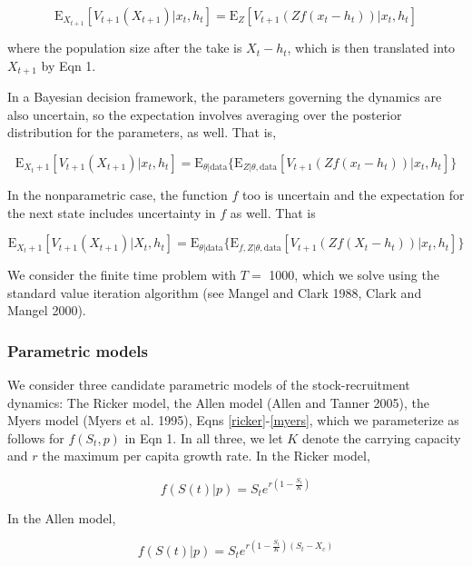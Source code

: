 \documentclass[author-year, 12pt,review]{components/elsarticle} %
\begin{document}
\[ \mathbf{\mathrm{E}}_{X_{t+1}} \left[ V_{t+1}( X_{t+1}) | x_t, h_t \right] = \mathbf{\mathrm{E}}_{Z} \left[ V_{t+1}( Z f(x_t - h_t))  | x_t, h_t \right] \]

where the population size after the take is $X_t-h_t$, which is then
translated into $X_{t+1}$ by Eqn 1.

In a Bayesian decision framework, the parameters governing the dynamics
are also uncertain, so the expectation involves averaging over the
posterior distribution for the parameters, as well. That is,

\[\mathbf{\mathrm{E}}_{X_t+1} \left[ V_{t+1}( X_{t+1}) | x_t, h_t \right] = \mathbf{\mathrm{E}}_{\theta|\mathrm{data}} \{ \mathbf{\mathrm{E}}_{Z | \theta, \mathrm{data}} \left[ V_{t+1}( Z f(x_t - h_t))  | x_t, h_t \right] \}\]

In the nonparametric case, the function $f$ too is uncertain and the
expectation for the next state includes uncertainty in $f$ as well. That
is

\[\mathbf{\mathrm{E}}_{X_t+1} \left[ V_{t+1}( X_{t+1}) | X_t, h_t \right] = \mathbf{\mathrm{E}}_{\theta|\mathrm{data}} \{ \mathbf{\mathrm{E}}_{f, Z | \theta, \mathrm{data}} \left[ V_{t+1}( Z f(X_t - h_t))  | x_t, h_t \right] \}\]

We consider the finite time problem with $T=$ 1000, which we solve using
the standard value iteration algorithm (see Mangel and Clark 1988, Clark
and Mangel 2000).

\subsubsection{Parametric models}\label{parametric-models}

We consider three candidate parametric models of the stock-recruitment
dynamics: The Ricker model, the Allen model (Allen and Tanner 2005), the
Myers model (Myers et al. 1995), Eqns \eqref{ricker}-\eqref{myers},
which we parameterize as follows for $f(S_t,p)$ in Eqn 1. In all three,
we let $K$ denote the carrying capacity and $r$ the maximum per capita
growth rate. In the Ricker model,

\begin{equation}
f(S(t)|p) = S_t e^{r \left(1 - \frac{S_t}{K} \right) } \label{ricker}
\end{equation}

In the Allen model,

\begin{equation}
f(S(t)|p) = S_t e^{r \left(1 - \frac{S_t}{K}\right)\left(S_t - X_c\right)} \label{allen}
\end{equation}
\end{document}
